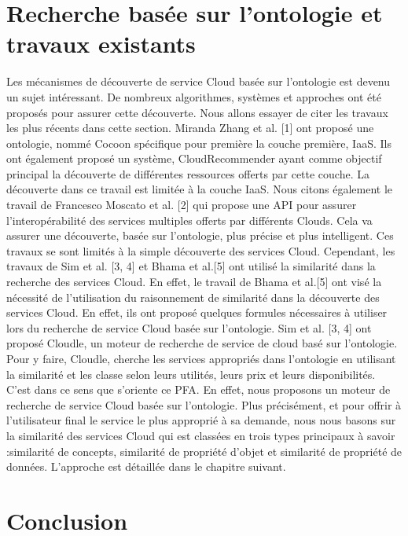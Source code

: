                \section{Recherche basée sur l'ontologie et travaux existants }
                    Les mécanismes de découverte de service Cloud basée sur l'ontologie est devenu un sujet intéressant. De nombreux algorithmes, systèmes et approches ont été proposés pour assurer cette découverte. Nous allons essayer de citer les travaux les plus récents dans cette section.
                    Miranda Zhang et al. [1] ont proposé une ontologie, nommé Cocoon spécifique pour première la couche première, IaaS. Ils ont également proposé un système, CloudRecommender ayant comme objectif principal la découverte de différentes ressources offerts par cette couche. La découverte dans ce travail est limitée à la couche IaaS.
                    Nous citons également le travail de Francesco Moscato et al. [2] qui propose une API pour assurer l'interopérabilité des services multiples offerts par différents Clouds. Cela va assurer une découverte, basée sur l'ontologie, plus précise et plus intelligent.
                    Ces travaux se sont limités à la simple découverte des services Cloud. Cependant, les travaux de Sim et al. [3, 4] et Bhama et al.[5] ont utilisé la similarité dans la recherche des services Cloud. En effet, le travail de Bhama et al.[5] ont visé la nécessité de l’utilisation du raisonnement de similarité dans  la découverte des services Cloud. En effet, ils ont proposé quelques formules nécessaires à utiliser lors du recherche de service Cloud basée sur l’ontologie.
                    Sim et al. [3, 4] ont proposé Cloudle, un moteur  de recherche de service de cloud basé sur l'ontologie. Pour y faire,  Cloudle, cherche les services appropriés dans l’ontologie en utilisant la similarité et les classe selon leurs utilités, leurs prix et leurs disponibilités.
                    C’est  dans ce sens que s’oriente ce PFA. En effet, nous proposons un moteur de recherche de service Cloud basée sur l’ontologie. Plus précisément, et pour offrir à l’utilisateur final le service le plus approprié  à sa demande, nous nous basons sur la similarité des services Cloud qui est classées en trois types principaux à savoir :similarité de concepts, similarité de propriété d’objet et similarité de propriété de données. L’approche est détaillée dans le chapitre suivant.


                \section{Conclusion}


